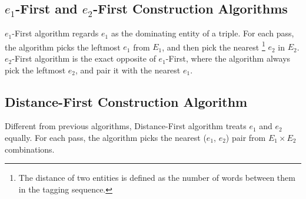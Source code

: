 \subsection*{$e_1$-First and $e_2$-First Construction Algorithms}
$e_1$-First algorithm regards $e_1$ as the dominating entity of a triple.
For each pass, the algorithm picks the leftmost $e_1$ from $E_1$,
and then pick the nearest
\footnote{The distance of two entities is defined as the number of words
between them in the tagging sequence.}
$e_2$ in $E_2$.
%
%
%    
%  
%  
$e_2$-First algorithm is the exact opposite of $e_1$-First, 
where the algorithm always pick the leftmost $e_2$, and pair it with the nearest $e_1$.

\subsection*{Distance-First Construction Algorithm}
Different from previous algorithms, Distance-First algorithm treats $e_1$ and $e_2$ equally.
For each pass, the algorithm picks the nearest ($e_1$, $e_2$) pair from $E_1 \times E_2$ combinations.

